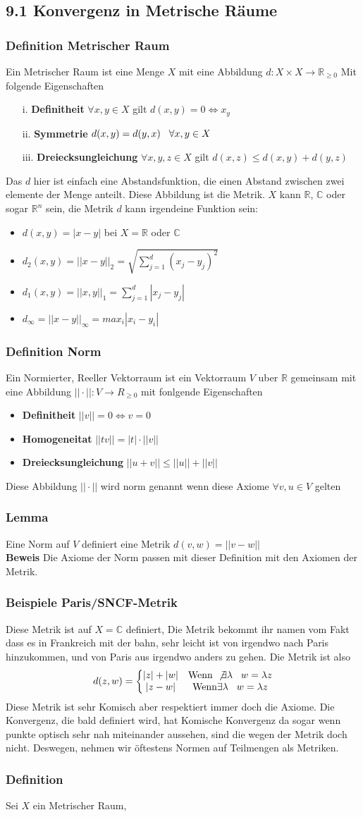 \documentclass{article}
\newcommand{\smspc}{\hspace{0.3cm}}
\newcommand{\beweis}{\\\textbf{Beweis }}
\newcommand{\beispiel}[1]{\subsubsection*{Beispiele {#1}}}
\newcommand{\lemma}[1]{\subsubsection*{Lemma {#1}}}
\newcommand{\definition}[1]{\subsubsection*{Definition {#1}}}
\begin{document}
\subsection*{9.1 Konvergenz in Metrische Räume}
\definition{Metrischer Raum} Ein Metrischer Raum ist eine Menge $X$ mit eine Abbildung $d:X\times X\rightarrow \mathbb{R}_{\ge 0}$ Mit folgende Eigenschaften
\begin{itemize}
  \item[i.]{\textbf{Definitheit} $\forall x,y\in X$ gilt $d(x,y)=0\Leftrightarrow x_y$}
  \item[ii.]{\textbf{Symmetrie} $d(x,y)=d(y,x)\smspc\forall x,y\in X$}
  \item[iii.]{\textbf{Dreiecksungleichung} $\forall x,y,z\in X$ gilt $d(x,z)\le d(x,y)+d(y,z)$}
\end{itemize}
Das $d$ hier ist einfach eine Abstandsfunktion, die einen Abstand zwischen zwei elemente der Menge anteilt. Diese Abbildung ist die Metrik.
$X$ kann $\mathbb{R}$, $\mathbb{C}$ oder sogar $\mathbb{R}^n$ sein, die Metrik $d$ kann irgendeine Funktion sein:
\begin{itemize}
  \item{$d(x,y)=|x-y|$ bei $X=\mathbb{R}$ oder $\mathbb{C}$}
  \item{$d_2(x,y)=||x-y||_2=\sqrt{\sum_{j=1}^d (x_j-y_j)^2}$}
  \item{$d_1(x,y)=||x,y||_1=\sum_{j=1}^d|x_j-y_j|$}
  \item{$d_\infty=||x-y||_\infty=max_i|x_i-y_i|$}
\end{itemize}
\definition{Norm} Ein Normierter, Reeller Vektorraum ist ein Vektorraum $V$ uber $\mathbb{R}$ gemeinsam mit eine Abbildung $||\cdot||:V\rightarrow R_{\ge0}$ mit fonlgende Eigenschaften
\begin{itemize}
  \item{\textbf{Definitheit} $||v||=0\Leftrightarrow v=0$}
  \item{\textbf{Homogeneitat} $||tv||=|t|\cdot||v||$}
  \item{\textbf{Dreiecksungleichung} $||u+v||\le||u||+||v||$}
\end{itemize}
Diese Abbildung $||\cdot||$ wird norm genannt wenn diese Axiome $\forall v,u\in V$ gelten
\lemma{}Eine Norm auf $V$ definiert eine Metrik $d(v,w)=||v-w||$ \beweis Die Axiome der Norm passen mit dieser Definition mit den Axiomen der Metrik.
\beispiel{Paris/SNCF-Metrik}
Diese Metrik ist auf $X=\mathbb{C}$ definiert, Die Metrik bekommt ihr namen vom Fakt dass es in Frankreich mit der bahn, sehr leicht ist von irgendwo nach Paris hinzukommen, und von Paris aus irgendwo anders zu gehen.
Die Metrik ist also \[d(z,w)=\left\lbrace\begin{matrix}|z|+|w|&\text{Wenn }\not\exists \lambda\smspc w=\lambda z\\|z-w|&\text{Wenn} \exists \lambda \smspc w=\lambda z\end{matrix}\right.\]
Diese Metrik ist sehr Komisch aber respektiert immer doch die Axiome. Die Konvergenz, die bald definiert wird, hat Komische Konvergenz da sogar wenn punkte optisch sehr nah miteinander aussehen, sind die wegen der Metrik doch nicht. Deswegen, nehmen wir öftestens Normen auf Teilmengen als Metriken.
\definition{} Sei $X$ ein Metrischer Raum, 
\end{document}
